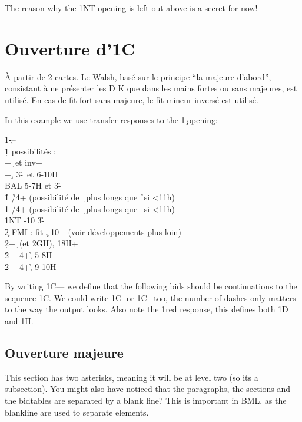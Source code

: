 \documentclass[a4paper]{article}
\begin{document}
The reason why the 1NT opening is left out above is a secret for
now!

\section{Ouverture d'1C}

À partir de 2 cartes. Le Walsh, basé sur le principe ``la majeure d'abord'', consistant à ne présenter les D
K que dans les mains fortes ou sans majeures, est utilisé.
En cas de fit fort sans majeure, le fit mineur inversé est utilisé.

In this example we use transfer responses to the 1\c\ opening:

\begin{bidtable}
1\c---\\
1\d {} possibilités :\\
+\d\ et inv+\\
+\d , 3-\h \s\ et 6-10H\\
\>BAL 5-7H et 3-\h \s \\
1\h \> \h /4+ (possibilité de \d\ plus longs que \h\ si <11h)\\
1\s \> \s /4+ (possibilité de \d\ plus longs que \s\ si <11h)\\
1NT -10 3-\h \s \\
2\c \> FMI : fit \c , 10+ (voir développements plus loin)\\
2\d {}+\d\ (et 2GH), 18H+\\
2\h {}+\s\ 4+\h , 5-8H\\
2\s {}+\s\ 4+\h , 9-10H
\end{bidtable}

By writing 1C--- we define that the following bids should be
continuations to the sequence 1C. We could write 1C- or 1C-- too,
the number of dashes only matters to the way the output looks. Also
note the 1red response, this defines both 1D and 1H.

\subsection{Ouverture majeure}

This section has two asterisks, meaning it will be at level two
(so its a subsection). You might also have noticed that the
paragraphs, the sections and the bidtables are separated by a
blank line? This is important in BML, as the blankline are used to
separate elements.
\end{document}
